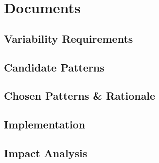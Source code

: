 \section{Documents}\label{sec:fa_documents}

\subsection{Variability Requirements}\label{sec:fa_documents_variability_requirements}

\subsection{Candidate Patterns}\label{sec:fa_documents_candidate_patterns}

\subsection{Chosen Patterns \& Rationale}\label{sec:fa_documents_chosen_patterns_rationale}

\subsection{Implementation}\label{sec:fa_documents_implementation}

\subsection{Impact Analysis}\label{sec:fa_documents_impact_analysis}
